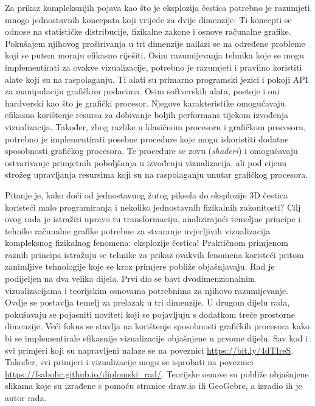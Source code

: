 \documentclass{foi}
\begin{document}
Za prikaz kompleksnijih pojava kao što je eksplozija čestica potrebno je razumjeti mnogo jednostavnih koncepata koji vrijede za dvije dimenzije. Ti koncepti se odnose na statističke distribucije, fizikalne zakone i osnove računalne grafike. Pokušajem njihovog proširivanja u tri dimenzije nailazi se na određene probleme koji se putem moraju efikasno riješiti. Osim razumijevanja tehnika koje se mogu implementirati za ovakve vizualizacije, potrebno je razumjeti i pravilno koristiti alate koji su na raspolaganju. Ti alati su primarno programski jezici i pokoji API za manipulaciju grafičkim podacima. Osim softverskih alata, postoje i oni hardverski kao što je grafički procesor. Njegove karakteristike omogućavaju efikasno korištenje resursa za dobivanje boljih performans tijekom izvođenja vizualizacija. Također, zbog razlike u klasičnom procesoru i grafičkom procesoru, potrebno je implementirati posebne procedure koje mogu iskoristiti dodatne sposobnosti grafičkog procesora. Te procedure se zovu (\textit{shaderi}) i omogućavaju ostvarivanje primjetnih poboljšanja u izvođenju vizualizacija, ali pod cijenu strožeg upravljanja resursima koji su na raspolaganju unutar grafičkog procesora.

Pitanje je, kako doći od jednostavnog žutog piksela do eksplozije 3D čestica koristeći malo programiranja i nekoliko jednostavnih fizikalnih zakonitosti? Cilj ovog rada je istražiti upravo tu transformaciju, analizirajući temeljne principe i tehnike računalne grafike potrebne za stvaranje uvjerljivih vizualizacija kompleksnog fizikalnog fenomena: eksplozije čestica! Praktičnom primjenom raznih principa istražuju se tehnike za prikaz ovakvih fenomena koristeći pritom zanimljive tehnologije koje se kroz primjere pobliže objašnjavaju. Rad je podijeljen na dva velika dijela. Prvi dio se bavi dvodimenzionalnim vizualizacijama i teorijskim osnovama potrebnima za njihovo razumijevanje. Ovdje se postavlja temelj za prelazak u tri dimenzije. U drugom dijelu rada, pokušavaju se pojasniti noviteti koji se pojavljuju s dodatkom treće prostorne dimenzije. Veći fokus se stavlja na korištenje sposobnosti grafičkih procesora kako bi se implementirale efikasnije vizualizacije objašnjene u prvome dijelu. Sav kod i svi primjeri koji su napravljeni nalaze se na poveznici \url{https://bit.ly/4dTIreS}. Također, svi primjeri i vizualizacije mogu se isprobati na poveznici \url{https://fsabolic.github.io/diplomski_rad/}. Teorijske osnove su pobliže objašnjene slikama koje su izrađene s pomoću stranice draw.io ili GeoGebre, a izradio ih je autor rada.
\end{document}
